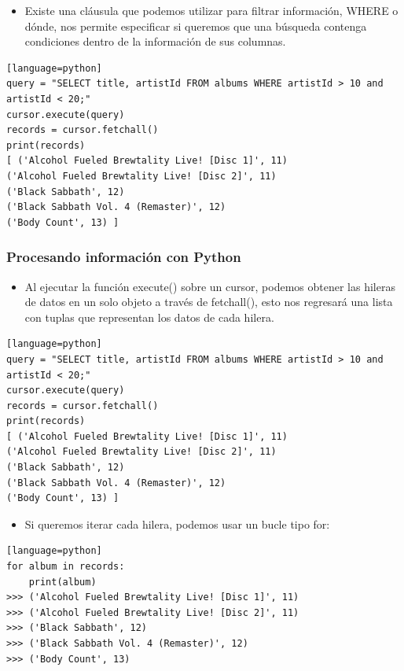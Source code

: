 \documentclass[hyperref={pdfpagelabels=false},xcolor=pst,pdf,fragile]{beamer}
\begin{document}
\begin{frame} [fragile]
    \begin{itemize}
    \item Existe una cláusula que podemos utilizar para filtrar información, WHERE o dónde, nos permite especificar si queremos que una búsqueda contenga condiciones dentro de la información de sus columnas.
    \end{itemize}
    \begin{lstlisting}[basicstyle=\tiny][language=python]
query = "SELECT title, artistId FROM albums WHERE artistId > 10 and artistId < 20;"
cursor.execute(query)
records = cursor.fetchall()
print(records)
[ ('Alcohol Fueled Brewtality Live! [Disc 1]', 11)
('Alcohol Fueled Brewtality Live! [Disc 2]', 11)
('Black Sabbath', 12)
('Black Sabbath Vol. 4 (Remaster)', 12)
('Body Count', 13) ]
    \end{lstlisting}
\end{frame}

\begin{frame} [fragile]
    \frametitle{Procesando información con Python}
    \begin{itemize}
    \item Al ejecutar la función execute() sobre un cursor, podemos obtener las hileras de datos en un solo objeto a través de fetchall(), esto nos regresará una lista con tuplas que representan los datos de cada hilera.
    \end{itemize}
    \begin{lstlisting}[basicstyle=\tiny][language=python]
query = "SELECT title, artistId FROM albums WHERE artistId > 10 and artistId < 20;"
cursor.execute(query)
records = cursor.fetchall()
print(records)
[ ('Alcohol Fueled Brewtality Live! [Disc 1]', 11)
('Alcohol Fueled Brewtality Live! [Disc 2]', 11)
('Black Sabbath', 12)
('Black Sabbath Vol. 4 (Remaster)', 12)
('Body Count', 13) ]
    \end{lstlisting}
\end{frame}

\begin{frame} [fragile]
    \begin{itemize}
    \item Si queremos iterar cada hilera, podemos usar un bucle tipo for:
    \end{itemize}
    \begin{lstlisting}[basicstyle=\tiny][language=python]
for album in records:
    print(album)
>>> ('Alcohol Fueled Brewtality Live! [Disc 1]', 11)
>>> ('Alcohol Fueled Brewtality Live! [Disc 2]', 11)
>>> ('Black Sabbath', 12)
>>> ('Black Sabbath Vol. 4 (Remaster)', 12)
>>> ('Body Count', 13)
    \end{lstlisting}
\end{frame}
\end{document}
